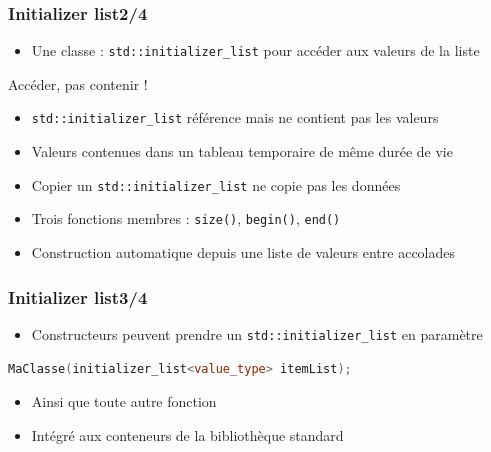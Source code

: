 \documentclass[C++.tex]{subfiles}
\begin{document}
\begin{frame}[fragile]
	\frametitle{Initializer list\titlehfill{}2/4}
	\begin{itemize}
		\item Une classe : \lstinline|std::initializer_list| pour accéder aux valeurs de la liste
	\end{itemize}

	\begin{alertblock}{Accéder, pas contenir !}
		\begin{itemize}
			\item \lstinline|std::initializer_list| référence mais ne contient pas les valeurs
			\item Valeurs contenues dans un tableau temporaire de même durée de vie
			\item Copier un \lstinline|std::initializer_list| ne copie pas les données
		\end{itemize}
	\end{alertblock}		

	\begin{itemize}
		\item Trois fonctions membres : \lstinline|size()|, \lstinline|begin()|, \lstinline|end()|
		\item Construction automatique depuis une liste de valeurs entre accolades
	\end{itemize}
\end{frame}

\begin{frame}[fragile]
	\frametitle{Initializer list\titlehfill{}3/4}
	\begin{itemize}
		\item Constructeurs peuvent prendre un \lstinline|std::initializer_list| en paramètre
	\end{itemize}

	\begin{lstlisting}[language=C++]
MaClasse(initializer_list<value_type> itemList);\end{lstlisting}

	\begin{itemize}
		\item Ainsi que toute autre fonction
		\item Intégré aux conteneurs de la bibliothèque standard
	\end{itemize}
\end{frame}
\end{document}
